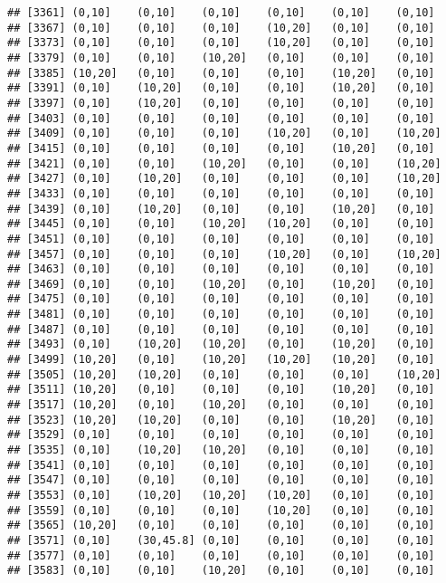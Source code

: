 \documentclass[]{article}
\begin{document}
\begin{verbatim}
## [3361] (0,10]    (0,10]    (0,10]    (0,10]    (0,10]    (0,10]   
## [3367] (0,10]    (0,10]    (0,10]    (10,20]   (0,10]    (0,10]   
## [3373] (0,10]    (0,10]    (0,10]    (10,20]   (0,10]    (0,10]   
## [3379] (0,10]    (0,10]    (10,20]   (0,10]    (0,10]    (0,10]   
## [3385] (10,20]   (0,10]    (0,10]    (0,10]    (10,20]   (0,10]   
## [3391] (0,10]    (10,20]   (0,10]    (0,10]    (10,20]   (0,10]   
## [3397] (0,10]    (10,20]   (0,10]    (0,10]    (0,10]    (0,10]   
## [3403] (0,10]    (0,10]    (0,10]    (0,10]    (0,10]    (0,10]   
## [3409] (0,10]    (0,10]    (0,10]    (10,20]   (0,10]    (10,20]  
## [3415] (0,10]    (0,10]    (0,10]    (0,10]    (10,20]   (0,10]   
## [3421] (0,10]    (0,10]    (10,20]   (0,10]    (0,10]    (10,20]  
## [3427] (0,10]    (10,20]   (0,10]    (0,10]    (0,10]    (10,20]  
## [3433] (0,10]    (0,10]    (0,10]    (0,10]    (0,10]    (0,10]   
## [3439] (0,10]    (10,20]   (0,10]    (0,10]    (10,20]   (0,10]   
## [3445] (0,10]    (0,10]    (10,20]   (10,20]   (0,10]    (0,10]   
## [3451] (0,10]    (0,10]    (0,10]    (0,10]    (0,10]    (0,10]   
## [3457] (0,10]    (0,10]    (0,10]    (10,20]   (0,10]    (10,20]  
## [3463] (0,10]    (0,10]    (0,10]    (0,10]    (0,10]    (0,10]   
## [3469] (0,10]    (0,10]    (10,20]   (0,10]    (10,20]   (0,10]   
## [3475] (0,10]    (0,10]    (0,10]    (0,10]    (0,10]    (0,10]   
## [3481] (0,10]    (0,10]    (0,10]    (0,10]    (0,10]    (0,10]   
## [3487] (0,10]    (0,10]    (0,10]    (0,10]    (0,10]    (0,10]   
## [3493] (0,10]    (10,20]   (10,20]   (0,10]    (10,20]   (0,10]   
## [3499] (10,20]   (0,10]    (10,20]   (10,20]   (10,20]   (0,10]   
## [3505] (10,20]   (10,20]   (0,10]    (0,10]    (0,10]    (10,20]  
## [3511] (10,20]   (0,10]    (0,10]    (0,10]    (10,20]   (0,10]   
## [3517] (10,20]   (0,10]    (10,20]   (0,10]    (0,10]    (0,10]   
## [3523] (10,20]   (10,20]   (0,10]    (0,10]    (10,20]   (0,10]   
## [3529] (0,10]    (0,10]    (0,10]    (0,10]    (0,10]    (0,10]   
## [3535] (0,10]    (10,20]   (10,20]   (0,10]    (0,10]    (0,10]   
## [3541] (0,10]    (0,10]    (0,10]    (0,10]    (0,10]    (0,10]   
## [3547] (0,10]    (0,10]    (0,10]    (0,10]    (0,10]    (0,10]   
## [3553] (0,10]    (10,20]   (10,20]   (10,20]   (0,10]    (0,10]   
## [3559] (0,10]    (0,10]    (0,10]    (10,20]   (0,10]    (0,10]   
## [3565] (10,20]   (0,10]    (0,10]    (0,10]    (0,10]    (0,10]   
## [3571] (0,10]    (30,45.8] (0,10]    (0,10]    (0,10]    (0,10]   
## [3577] (0,10]    (0,10]    (0,10]    (0,10]    (0,10]    (0,10]   
## [3583] (0,10]    (0,10]    (10,20]   (0,10]    (0,10]    (0,10]   

\end{verbatim}
\end{document}
